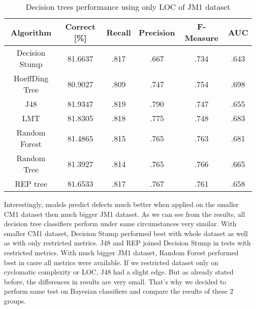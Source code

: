 \begin{table}[h!]
\centering
\begin{tabular}{ |c|c|c|c|c|c| } 
 \hline
 \textbf{Algorithm} & \textbf{Correct [\%]} & \textbf{Recall} & \textbf{Precision} & \textbf{F-Measure} & \textbf{AUC}  \\ 
 \hline
 Decision Stump & 81.6637 & .817 & .667 & .734 & .643   \\ 
 \hline
 HoeffDing Tree & 80.9027 & .809 & .747 & .754 & \textcolor{myRed}{.698}   \\ 
 \hline
  J48 & \textcolor{myRed}{81.9347} & \textcolor{myRed}{.819} & \textcolor{myRed}{.790} & .747 & .655   \\ 
 \hline
  LMT & 81.8305 & .818 & .775 & .748 & .683    \\ 
 \hline
  Random Forest & 81.4865 & .815 & .765 & .763 & .681   \\ 
 \hline
 Random Tree  & 81.3927 & .814 & .765 & \textcolor{myRed}{.766} & .665   \\ 
 \hline
 REP tree & 81.6533 & .817 & .767 & .761 & .658   \\ 
 \hline
\end{tabular}
\caption{Decision trees performance using only LOC of JM1 dataset}
\label{table:DT_LOC_JM1}
\end{table}

Interestingly, models predict defects much better when applied on the smaller CM1 dataset then much bigger JM1 dataset. As we can see from the results, all decision tree classifiers perform under same circumstances very similar. With smaller CM1 dataset, Decision Stump performed best with whole dataset as well as with only restricted metrics. J48 and REP joined Decision Stump in tests with restricted metrics. With  much bigger JM1 dataset, Random Forest performed best in casre all metrics were available. If we restricted dataset only on cyclomatic complexity or LOC, J48 had a slight edge. But as already stated before, the differences in results are very small. That's why we decided to perform same test on Bayesian classifiers and compare the results of these 2 groups.